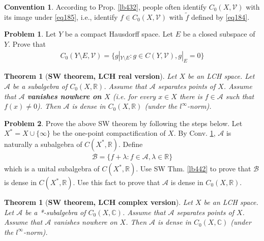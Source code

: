 \documentclass[12pt,b5paper,notitlepage]{article}
\theoremstyle{definition}
\newtheorem{cv}[df]{Convention}
\newtheorem{prob}{\color{red}Problem}[section]
\theoremstyle{plain}
\newtheorem{thm}[df]{Theorem}
\newcommand{\mc}{\mathcal}
\newcommand{\wtd}{\widetilde}
\newcommand{\scr}{\mathscr}
\newcommand{\Cbb}{\mathbb C}
\newcommand{\Rbb}{\mathbb R}
\numberwithin{equation}{section}
\begin{document}
\begin{cv}\label{lb449}
According to Prop. \ref{lb432}, people often identify $C_0(X,\mc V)$ with its image under \eqref{eq185}, i.e., identify $f\in C_0(X,\mc V)$ with $\wtd f$ defined by \eqref{eq184}.
\end{cv}








\begin{prob}\label{lb544}
Let $Y$ be a compact Hausdorff space. Let $E$ be a closed subspace of $Y$. Prove that 
\begin{align*}
C_0(Y\setminus E,\mc V)=\{g|_{Y\setminus E}:g\in C(Y,\mc V),g|_E=0\}
\end{align*}
\end{prob}



\begin{thm}[\textbf{SW theorem, LCH real version}]\label{lb545}
Let $X$ be an LCH space. Let $\scr A$ be a subalgebra of $C_0(X,\Rbb)$. Assume that $\scr A$ separates points of $X$. Assume that $\scr A$ \textbf{vanishes nowhere on $X$}  (i.e. for every $x\in X$ there is $f\in\scr A$ such that $f(x)\neq0$). Then $\scr A$ is dense in $C_0(X,\Rbb)$ (under the $l^\infty$-norm).
\end{thm}

\begin{prob}
Prove the above SW theorem by following the steps below. Let $X^*=X\cup\{\infty\}$ be the one-point compactification of $X$. By Conv. \ref{lb449}, $\scr A$ is naturally a subalgebra of $C(X^*,\Rbb)$. Define
\begin{align*}
\scr B=\{f+\lambda:f\in\scr A,\lambda\in\Rbb\}
\end{align*}
which is a unital subalgebra of $C(X^*,\Rbb)$. Use SW Thm. \ref{lb442} to prove that $\scr B$ is dense in $C(X^*,\Rbb)$. Use this fact to prove that $\scr A$ is dense in $C_0(X,\Rbb)$.
\end{prob}



\begin{thm}[\textbf{SW theorem, LCH complex version}]
Let $X$ be an LCH space. Let $\scr A$ be a *-subalgebra of $C_0(X,\Cbb)$. Assume that $\scr A$ separates points of $X$. Assume that $\scr A$ vanishes nowhere on $X$. Then $\scr A$ is dense in $C_0(X,\Cbb)$ (under the $l^\infty$-norm).
\end{thm}
\end{document}
